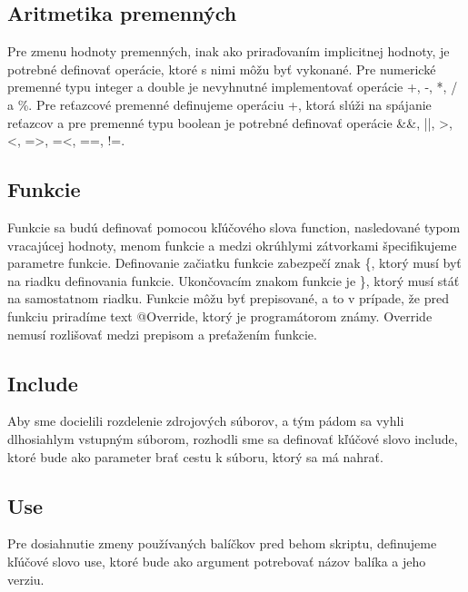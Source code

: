 \subsection{Aritmetika premenných}
\indent Pre zmenu hodnoty premenných, inak ako priraďovaním implicitnej hodnoty, je potrebné definovať operácie, ktoré s nimi môžu byť vykonané. Pre numerické premenné typu integer a double je nevyhnutné implementovať operácie +, -, *, / a \%. Pre reťazcové premenné definujeme operáciu +, ktorá slúži na spájanie reťazcov a pre premenné typu boolean je potrebné definovať operácie \&\&, ||, >, <, =>, =<, ==, !=.
\subsection{Funkcie}
\indent Funkcie sa budú definovať pomocou kľúčového slova function, nasledované typom vracajúcej hodnoty, menom funkcie a medzi okrúhlymi zátvorkami špecifikujeme parametre funkcie.
Definovanie začiatku funkcie zabezpečí znak \{, ktorý musí byť na riadku definovania funkcie. Ukončovacím znakom funkcie je \}, ktorý musí stáť na samostatnom riadku. Funkcie môžu byť prepisované, a to v prípade, že pred funkciu priradíme text @Override, ktorý je programátorom známy. Override nemusí rozlišovať medzi prepisom a preťažením funkcie. 
\subsection{Include}
\indent Aby sme docielili rozdelenie zdrojových súborov, a tým pádom sa vyhli dlhosiahlym vstupným súborom, rozhodli sme sa definovať kľúčové slovo include, ktoré bude ako parameter brať cestu k súboru, ktorý sa má nahrať. 
\subsection{Use}
\indent Pre dosiahnutie zmeny používaných balíčkov pred behom skriptu, definujeme kľúčové slovo use, ktoré bude ako argument potrebovať názov balíka a jeho verziu. 
